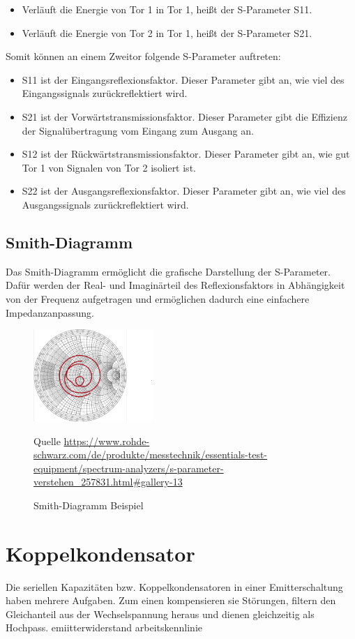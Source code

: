 \begin{itemize}
    \item Verläuft die Energie von Tor 1 in Tor 1, heißt der S-Parameter S11.
    \item Verläuft die Energie von Tor 2 in Tor 1, heißt der S-Parameter S21.
\end{itemize}
Somit können an einem Zweitor folgende S-Parameter auftreten:
\begin{itemize}
    \item S11 ist der Eingangsreflexionsfaktor. Dieser Parameter gibt an, wie viel des Eingangssignals zurückreflektiert wird.
    \item S21 ist der Vorwärtstransmissionsfaktor. Dieser Parameter gibt die Effizienz der Signalübertragung vom Eingang zum Ausgang an.
    \item S12 ist der Rückwärtstransmissionsfaktor. Dieser Parameter gibt an, wie gut Tor 1 von Signalen von Tor 2 isoliert ist.
    \item S22 ist der Ausgangsreflexionsfaktor. Dieser Parameter gibt an, wie viel des Ausgangssignals zurückreflektiert wird.
\end{itemize}
\subsection{Smith-Diagramm}
Das Smith-Diagramm ermöglicht die grafische Darstellung der S-Parameter.
Dafür werden der Real- und Imaginärteil des Reflexionsfaktors in Abhängigkeit von der Frequenz
aufgetragen und ermöglichen dadurch eine einfachere Impedanzanpassung.
\begin{figure}[h]
    \centering
    \includegraphics[width=0.4\textwidth]{Pictures/SmithDiagram.png}
    \caption{Smith-Diagramm Beispiel}
    \footnotesize{Quelle \url{https://www.rohde-schwarz.com/de/produkte/messtechnik/essentials-test-equipment/spectrum-analyzers/s-parameter-verstehen_257831.html#gallery-13}}
\end{figure}
\section{Koppelkondensator}
Die seriellen Kapazitäten bzw. Koppelkondensatoren in einer Emitterschaltung haben mehrere Aufgaben. Zum einen kompensieren sie Störungen, filtern den Gleichanteil aus der Wechselspannung 
heraus und dienen gleichzeitig als Hochpass.
\clearpage
emiitterwiderstand
arbeitskennlinie